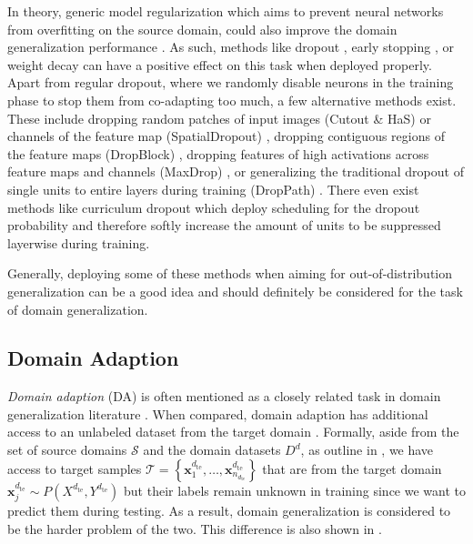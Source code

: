 In theory, generic model regularization which aims to prevent neural networks from overfitting on the source domain, could also improve the domain generalization performance \citep{huang2020selfchallenging}. As such, methods like dropout \citep{SrivastavaHKSS14}, early stopping \citep{CaruanaLG00}, or weight decay \citep{NowlanH92} can have a positive effect on this task when deployed properly. Apart from regular dropout, where we randomly disable neurons in the training phase to stop them from co-adapting too much, a few alternative methods exist. These include dropping random  patches of input images (Cutout \& HaS) \citep{devries2017improved, SinghL17} or channels of the feature map (SpatialDropout) \citep{TompsonGJLB15}, dropping contiguous regions of the feature maps (DropBlock) \citep{GhiasiLL18}, dropping features of high activations across feature maps and channels (MaxDrop) \citep{ParkK16}, or generalizing the traditional dropout of single units to entire layers during training (DropPath) \citep{LarssonMS17}. There even exist methods like curriculum dropout \citep{MorerioCVVM17} which deploy scheduling for the dropout probability and therefore softly increase the amount of units to be suppressed layerwise during training. 

Generally, deploying some of these methods when aiming for out-of-distribution generalization can be a good idea and should definitely be considered for the task of domain generalization.


\subsection{Domain Adaption}

\emph{Domain adaption} (DA) is often mentioned as a closely related task in domain generalization literature \citep{MotiianPAD17, VolpiM19, QiaoZP20}. When compared, domain adaption has additional access to an unlabeled dataset from the target domain \citep{mancini2020, Csurka17}. Formally, aside from the set of source domains $\mathcal{S}$ and the domain datasets $D^d$, as outline in , we have access to target samples $\mathcal{T} = \left\{\mathbf{x}_{1}^{d_\mathrm{te}},\dots,\mathbf{x}_{n_{d_{\mathrm{te}}}}^{d_\mathrm{te}}\right\}$ that are from the target domain $\mathbf{x}_j^{d_{ \mathrm{te}}} \sim P(X^{d_{ \mathrm{te}}},Y^{d_{ \mathrm{te}}})$ but their labels remain unknown in training since we want to predict them during testing. As a result, domain generalization is considered to be the harder problem of the two. This difference is also shown in .

